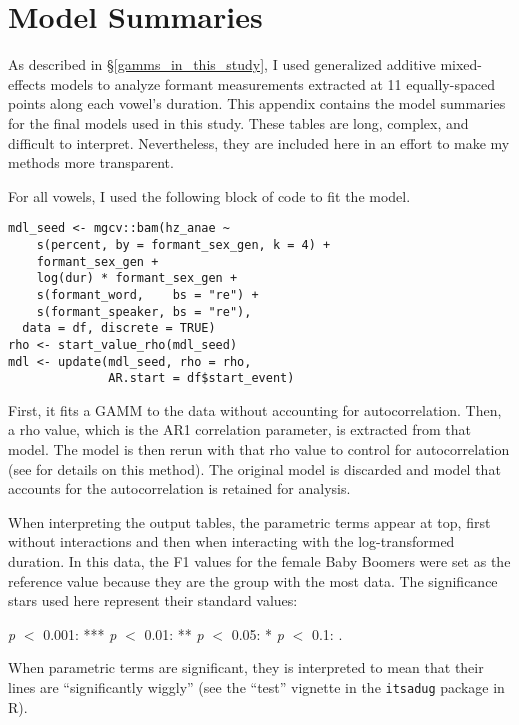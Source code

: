 \chapter{Model Summaries}
\label{appendix:model_summaries}

As described in \S\ref{gamms_in_this_study}, I used generalized additive mixed-effects models to analyze formant measurements extracted at 11 equally-spaced points along each vowel's duration. This appendix contains the model summaries for the final models used in this study. These tables are long, complex, and difficult to interpret. Nevertheless, they are included here in an effort to make my methods more transparent.

For all vowels, I used the following block of code to fit the model.
\begin{verbatim}
mdl_seed <- mgcv::bam(hz_anae ~
    s(percent, by = formant_sex_gen, k = 4) +
    formant_sex_gen +
    log(dur) * formant_sex_gen +
    s(formant_word,    bs = "re") +
    s(formant_speaker, bs = "re"),
  data = df, discrete = TRUE)
rho <- start_value_rho(mdl_seed)
mdl <- update(mdl_seed, rho = rho,
              AR.start = df$start_event)
\end{verbatim}
First, it fits a GAMM to the data without accounting for autocorrelation. Then, a rho value, which is the AR1 correlation parameter, is extracted from that model. The model is then rerun with that rho value to control for autocorrelation (see \citealt{soskuthy_etal_2018} for details on this method). The original model is discarded and model that accounts for the autocorrelation is retained for analysis.

When interpreting the output tables, the parametric terms appear at top, first without interactions and then when interacting with the log-transformed duration. In this data, the F1 values for the female Baby Boomers were set as the reference value because they are the group with the most data. The significance stars used here represent their standard values:
\begin{center}
    \textit{p} $<$  0.001: *** \hspace{1em}
    \textit{p} $<$  0.01: **   \hspace{1em}
    \textit{p} $<$  0.05: *    \hspace{1em}
    \textit{p} $<$  0.1: .
\end{center}
When parametric terms are significant, they is interpreted to mean that their lines are ``significantly wiggly'' (see the ``test'' vignette in the \texttt{itsadug} package in R).

